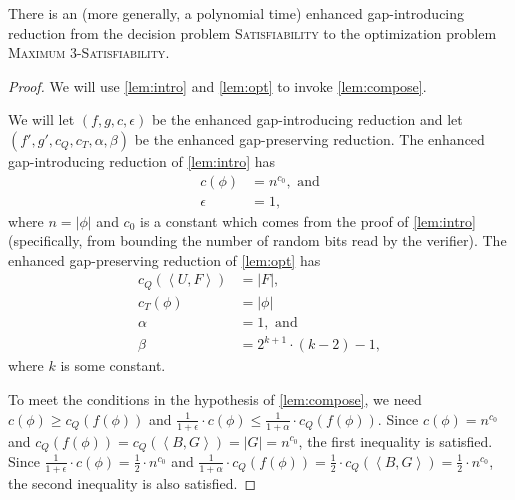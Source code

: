 \documentclass[]{article}
\newcommand{\pair}[2]{{\left\langle{#1}, {#2}\right\rangle}}
\begin{document}
\begin{lemma}\label{lem:gap3}
  There is an \NC{} (more generally, a polynomial time) enhanced gap-introducing reduction from the decision problem \textsc{Satisfiability} to the optimization problem \textsc{Maximum 3-Satisfiability}.
\end{lemma}
\begin{proof}
  We will use \autoref{lem:intro} and \autoref{lem:opt} to invoke \autoref{lem:compose}.

  We will let $(f, g, c, \epsilon)$ be the \NC{} enhanced gap-introducing reduction and let $(f', g', c_Q, c_T, \alpha, \beta)$ be the \NC{} enhanced gap-preserving reduction.
  The enhanced gap-introducing reduction of \autoref{lem:intro} has
  \begin{align*}
    c(\phi) & = n^{c_0}, \text{ and} \\
    \epsilon & = 1,
  \end{align*}
  where $n = |\phi|$ and $c_0$ is a constant which comes from the proof of \autoref{lem:intro} (specifically, from bounding the number of random bits read by the verifier).
  The enhanced gap-preserving reduction of \autoref{lem:opt} has
  \begin{align*}
    c_Q(\pair{U}{F}) & = |F|, \\
    c_T(\phi) & = |\phi| \\
    \alpha & = 1, \text{ and} \\
    \beta & = 2^{k + 1} \cdot (k - 2) - 1,
  \end{align*}
  where $k$ is some constant.

  To meet the conditions in the hypothesis of \autoref{lem:compose}, we need $c(\phi) \geq c_Q(f(\phi))$ and $\frac{1}{1 + \epsilon} \cdot c(\phi) \leq \frac{1}{1 + \alpha} \cdot c_Q(f(\phi))$.
  Since $c(\phi) = n^{c_0}$ and $c_Q(f(\phi)) = c_Q(\pair{B}{G}) = |G| = n^{c_0}$, the first inequality is satisfied.
  Since $\frac{1}{1 + \epsilon} \cdot c(\phi) = \frac{1}{2} \cdot n^{c_0}$ and $\frac{1}{1 + \alpha} \cdot c_Q(f(\phi)) = \frac{1}{2} \cdot c_Q(\pair{B}{G}) = \frac{1}{2} \cdot n^{c_0}$, the second inequality is also satisfied.


\end{proof}
\end{document}

